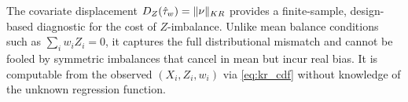 \begin{remark}\label{rem:diagnostic}
	The covariate displacement $D_Z(\hat{\tau}_w) = \lVert\nu\rVert_{KR}$ provides a finite-sample, design-based diagnostic for the cost of $Z$-imbalance.
	Unlike mean balance conditions such as $\sum_i w_i Z_i = 0$, it captures the full distributional mismatch and cannot be fooled by symmetric imbalances that cancel in mean but incur real bias.
	It is computable from the observed $(X_i, Z_i, w_i)$ via \eqref{eq:kr_cdf} without knowledge of the unknown regression function.
\end{remark}
